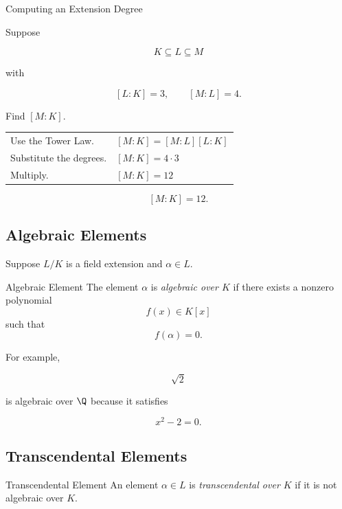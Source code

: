 \begin{workedexamplebox}{Computing an Extension Degree}

Suppose

\[ K\subseteq L\subseteq M \]

with

\[ [L:K]=3,\qquad[M:L]=4. \]

Find \([M:K]\).

\begin{tabularx}{\textwidth}{@{}>{\raggedright\arraybackslash}p{}X@{}}
Use the Tower Law. & \([M:K]=[M:L][L:K]\)\\
Substitute the degrees. & \([M:K]=4\cdot3\)\\
Multiply. & \([M:K]=12\)
\end{tabularx}

\begin{answerbox}
\[ [M:K]=12. \]
\end{answerbox}
\end{workedexamplebox}

\subsection{Algebraic Elements}
\label{subsec:algebraic-elements}

Suppose \(L/K\) is a field extension and \(\alpha\in L\).

\begin{definitionbox}{Algebraic Element}
The element \(\alpha\) is \emph{algebraic over \(K\)} if there exists a
nonzero polynomial
\[ f(x)\in K[x] \]
such that
\[ f(\alpha)=0. \]
\end{definitionbox}

For example,

\[ \sqrt2 \]

is algebraic over \(\Q\) because it satisfies

\[ x^2-2=0. \]

\subsection{Transcendental Elements}
\label{subsec:transcendental-elements}

\begin{definitionbox}{Transcendental Element}
An element \(\alpha\in L\) is \emph{transcendental over \(K\)} if it is not
algebraic over \(K\).
\end{definitionbox}

